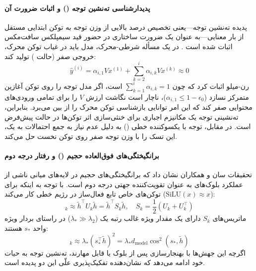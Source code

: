 \paragraph*{پدیدارشناسی ته‌نشین توجه () و اثبات ضرورت آن}
پدیده ته‌نشین توجه—یعنی تخصیص درصد بالایی از وزن توجه به توکن ابتدایی مستقل از بار معنایی—به عنوان یک ضرورت ساختاری در حضور قید سیمپلکس سافت‌مکس اثبات شده است \cite{ranmilo2026attention}. 
در یک مسأله شرطی-محرک، مدل باید در غیاب توکن محرک، خروجی صفر (حالت ) تولید کند:
\begin{equation}
    \hat{y}^{(i)} = \alpha_{i,1} V x^{(1)} + \sum_{k=2}^{i} \alpha_{i,k} V x^{(k)} \approx 0
\end{equation}
رن-میلو \cite{ranmilo2026attention} اثبات کرد که چون $\sum_{k=1}^i \alpha_{i,k} = 1$ است، اگر مدل توجه را روی توکن آغازین متمرکز نسازد ($\alpha_{i,1} \le 1 - \epsilon_0$)، ناچار است نگاشت ارزش $V$ را برای تمامی ورودی‌های محتوایی صفر کند که این امر توانایی بازشناسی توکن محرک را از بین می‌برد. بنابراین، ته‌نشینی توجه یک مکانیزم اجباری برای خنثی‌سازی اثر توکن‌ها در حالت پیش‌فرض است. در مقابل، توجه با یکسوکننده خطی () به دلیل عدم نیاز به جمع احتمالات به یک، این تسک را با وزن توجه صفر روی توکن نخست حل می‌کند.

\paragraph*{برانگیختگی‌های فوق‌العاده حجیم () و رفتار درجه دوم }
تحقیقات سان و همکاران \cite{sun2026spike} نشان داد که برانگیختگی‌های حجیم در لایه‌های میانی ناشی از عملکرد بلوک‌های  به عنوان تقویت‌کننده جهتی درجه دوم است. با توجه به اینکه برای توکن‌های خاص تابع فعال‌ساز در رژیم خطی کار می‌کند ($\text{SiLU}(x) \approx x$):
\begin{equation}
    [F_{\text{ffn}}(\tilde{h})]_k \approx \tilde{h}^\top U_k \tilde{h} = \tilde{h}^\top S_k \tilde{h}, \quad S_k = \frac{1}{2}(U_k + U_k^\top)
\end{equation}
ماتریس‌های $S_k$ دارای یک مقدار ویژه غالب رتبه یک ($\lambda_* \gg \lambda_2$) در راستای بردار ویژه واحد $s_*$ هستند:
\begin{equation}
    [F_{\text{ffn}}(\tilde{h})]_k \approx \lambda_* (s_*^\top \tilde{h})^2 = \lambda_* d_{\text{model}} \cos^2(s_*, \tilde{h})
\end{equation}
اگرچه این جهش‌ها با بهنجارسازی پس از بلوک یا  قابل مهارند، ته‌نشین توجه به حیات خود ادامه می‌دهد که نشان‌دهنده تفکیک‌پذیری علّی این دو پدیده است.

